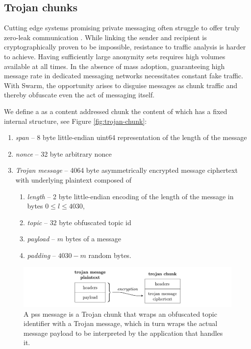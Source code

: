 \subsection{Trojan chunks\statusgreen}\label{sec:trojan}

Cutting edge systems promising private messaging often struggle to offer truly zero-leak communication \cite{kwon2016riffle}. While linking the sender and recipient is cryptographically proven to be impossible, resistance to traffic analysis is harder to achieve. Having sufficiently large anonymity sets requires high volumes available at all times. In the absence of mass adoption, guaranteeing high message rate in dedicated messaging networks necessitates constant fake traffic. With Swarm, the opportunity arises to disguise messages as chunk traffic and thereby obfuscate even the act of messaging itself. 

We define a  as a content addressed chunk the content of which has a fixed internal structure, see Figure \ref{fig:trojan-chunk}:

\begin{enumerate}
    \item \emph{span} -- 8 byte little-endian uint64 representation of the length of the message  
    \item \emph{nonce} -- 32 byte arbitrary nonce 
    \item \emph{Trojan message} -- 4064 byte asymmetrically encrypted message ciphertext with underlying plaintext composed of
    \begin{enumerate}
        \item \emph{length} -- 2 byte little-endian encoding of the length of the message in bytes $0\leq l\leq 4030$,
        \item \emph{topic} -- $32$ byte obfuscated topic id   
        \item \emph{payload} -- $m$ bytes of a message 
        \item \emph{padding} -- $4030-m$ random bytes.
    \end{enumerate}
\end{enumerate}

\begin{figure}[htbp]
\centering
\includegraphics[width=\textwidth]{fig/trojan-generic.pdf}
\caption[Trojan chunk or pss message\statusgreen]{A pss message is a Trojan chunk that wraps an obfuscated topic identifier with a Trojan message, which in turn wraps the actual message payload to be interpreted by the application that handles it.}
\label{fig:trojan-generic}
\end{figure}

